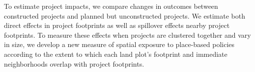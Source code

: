 \documentclass[12pt]{article}
\begin{document}
% 
% 
% 
% 



To estimate project impacts, we compare changes in outcomes between constructed projects and planned but unconstructed projects.  We estimate both direct effects in project footprints as well as spillover effects nearby project footprints.  To measure these effects when projects are clustered together and vary in size, we develop a new measure of spatial exposure to place-based policies according to the extent to which each land plot's footprint and immediate neighborhoods overlap with project footprints.  
\end{document}
